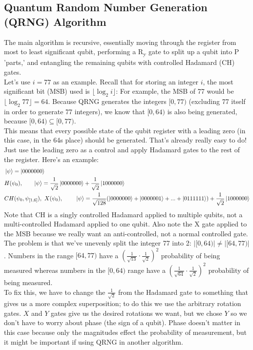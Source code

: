 \documentclass[12pt]{article}
\begin{document}
\subsection{Quantum Random Number Generation (QRNG) Algorithm}
The main algorithm is recursive, essentially moving through the register from most to least significant qubit, performing a R\textsubscript{y} gate to split up a qubit into P 'parts,' and entangling the remaining qubits with controlled Hadamard (CH) gates. \\
Let's use $i = 77$ as an example. Recall that for storing an integer $i$, the most significant bit (MSB) used is $\lfloor \log_2 i \rfloor$: For example, the MSB of 77 would be $\lfloor \log_2 77 \rfloor = 64$. Because QRNG generates the integers $[0, 77)$ (excluding 77 itself in order to generate 77 integers), we know that $[0, 64)$ is also being generated, because $[0, 64) \subseteq [0, 77)$. \\
This means that every possible state of the qubit register with a leading zero (in this case, in the 64s place) should be generated. That's already really easy to do! Just use the leading zero as a control and apply Hadamard gates to the rest of the register. Here's an example:
\begin{align*}
& \ket{\psi} = \ket{0000000} \\
& H(\psi_0), \ \ \ \ \ \ \ket{\psi} = \frac{1}{\sqrt{2}} \ket{0000000} + \frac{1}{\sqrt{2}} \ket{1000000} \\
& CH(\psi_0, \psi_{[1, 6]}), \ X(\psi_0), \ \ \ \ \ \ \ \ket{\psi} = \frac{1}{\sqrt{128}}(\ket{0000000} + \ket{0000001} + ... + \ket{0111111}) + \frac{1}{\sqrt{2}} \ket{1000000}
\end{align*}
Note that CH is a singly controlled Hadamard applied to multiple qubits, not a multi-controlled Hadamard applied to one qubit. Also note the X gate applied to the MSB because we really want an anti-controlled, not a normal controlled gate. \\
The problem is that we've unevenly split the integer 77 into 2: $|[0, 64)| \neq |[64, 77)|$. Numbers in the range $[64, 77)$ have a $(\frac{1}{\sqrt{13}} \cdot \frac{1}{\sqrt{2}})^2$ probability of being measured whereas numbers in the $[0, 64)$ range have a $(\frac{1}{\sqrt{64}} \cdot \frac{1}{\sqrt{2}})^2$ probability of being measured. \\
To fix this, we have to change the $\frac{1}{\sqrt{2}}$ from the Hadamard gate to something that gives us a more complex superposition; to do this we use the arbitrary rotation gates. $X$ and $Y$ gates give us the desired rotations we want, but we chose $Y$ so we don't have to worry about phase (the sign of a qubit). Phase doesn't matter in this case because only the magnitudes effect the probability of measurement, but it might be important if using QRNG in another algorithm. \\
\end{document}
